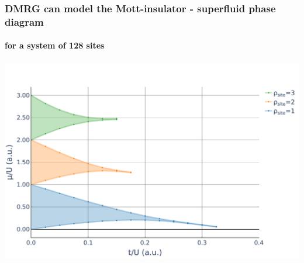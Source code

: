 \documentclass[aspectratio=169]{beamer}
\begin{document}
\begin{frame}
  \frametitle{DMRG can model the Mott-insulator - superfluid phase diagram}
  \framesubtitle{for a system of 128 sites}
  \begin{center}
    \includegraphics[scale=0.3]{../img/Mott-Lobes.pdf}
  \end{center}
\end{frame}
\end{document}
